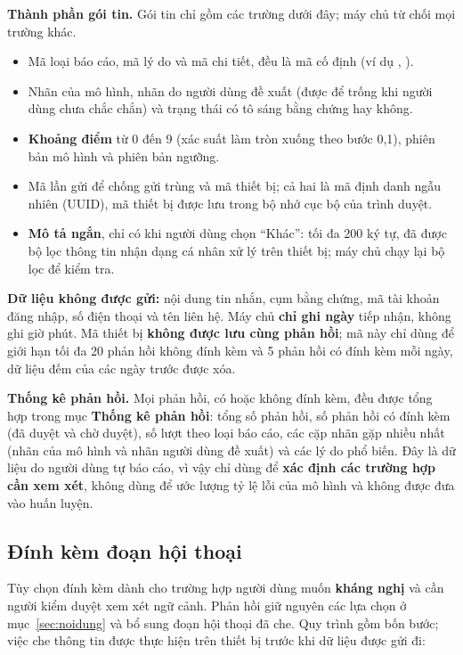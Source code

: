 \documentclass[11pt,a4paper]{article}
\newcommand{\nhan}[1]{\texttt{\detokenize{#1}}}
\begin{document}
\textbf{Thành phần gói tin.} Gói tin chỉ gồm các trường dưới đây; máy chủ từ chối mọi trường khác.
\begin{itemize}[leftmargin=*]
\item Mã loại báo cáo, mã lý do và mã chi tiết, đều là mã cố định (ví dụ \nhan{tin_nhan_an_toan},
  \nhan{dua_noi_than_mat}).
\item Nhãn của mô hình, nhãn do người dùng đề xuất (được để trống khi người dùng chưa chắc chắn) và trạng thái
  có tô sáng bằng chứng hay không.
\item \textbf{Khoảng điểm} từ 0 đến 9 (xác suất làm tròn xuống theo bước 0,1), phiên bản mô hình và phiên bản ngưỡng.
\item Mã lần gửi để chống gửi trùng và mã thiết bị; cả hai là mã định danh ngẫu nhiên (UUID), mã thiết bị được
  lưu trong bộ nhớ cục bộ của trình duyệt.
\item \textbf{Mô tả ngắn}, chỉ có khi người dùng chọn ``Khác'': tối đa 200 ký tự, đã được bộ lọc thông tin nhận
  dạng cá nhân xử lý trên thiết bị; máy chủ chạy lại bộ lọc để kiểm tra.
\end{itemize}

\textbf{Dữ liệu không được gửi:} nội dung tin nhắn, cụm bằng chứng, mã tài khoản đăng nhập, số điện thoại và
tên liên hệ. Máy chủ \textbf{chỉ ghi ngày} tiếp nhận, không ghi giờ phút. Mã thiết bị \textbf{không được lưu cùng
phản hồi}; mã này chỉ dùng để giới hạn tối đa 20 phản hồi không đính kèm và 5 phản hồi có đính kèm mỗi ngày,
dữ liệu đếm của các ngày trước được xóa.

\textbf{Thống kê phản hồi.} Mọi phản hồi, có hoặc không đính kèm, đều được tổng hợp trong mục
\textbf{Thống kê phản hồi}: tổng số phản hồi, số phản hồi có đính kèm (đã duyệt và chờ duyệt), số lượt theo loại báo
cáo, các cặp nhãn gặp nhiều nhất (nhãn của mô hình và nhãn người dùng đề xuất) và các lý do phổ biến. Đây là dữ liệu do người dùng tự báo cáo, vì vậy chỉ
dùng để \textbf{xác định các trường hợp cần xem xét}, không dùng để ước lượng tỷ lệ lỗi của mô hình và không
được đưa vào huấn luyện.

\subsection{Đính kèm đoạn hội thoại}
\label{sec:dinhkem}

Tùy chọn đính kèm dành cho trường hợp người dùng muốn \textbf{kháng nghị} và cần người kiểm duyệt xem xét ngữ cảnh.
Phản hồi giữ nguyên các lựa chọn ở mục~\ref{sec:noidung} và bổ sung đoạn hội thoại đã che. Quy trình gồm bốn bước;
việc che thông tin được thực hiện trên thiết bị trước khi dữ liệu được gửi đi:
\end{document}

